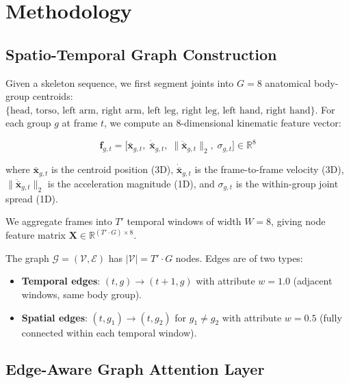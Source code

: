 \documentclass[conference]{IEEEtran}
\begin{document}
\section{Methodology}
\label{sec:method}

\subsection{Spatio-Temporal Graph Construction}

Given a skeleton sequence, we first segment joints into $G=8$ anatomical body-group 
centroids: $\{\text{head, torso, left arm, right arm, left leg, right leg, 
left hand, right hand}\}$.
For each group $g$ at frame $t$, we compute an 8-dimensional kinematic feature vector:

\begin{equation}
  \mathbf{f}_{g,t} = \bigl[\bar{\mathbf{x}}_{g,t},\; \dot{\bar{\mathbf{x}}}_{g,t},\;
  \|\ddot{\bar{\mathbf{x}}}_{g,t}\|_2,\; \sigma_{g,t}\bigr]
  \in \mathbb{R}^{8}
  \label{eq:node_feat}
\end{equation}

where $\bar{\mathbf{x}}_{g,t}$ is the centroid position (3D), 
$\dot{\bar{\mathbf{x}}}_{g,t}$ is the frame-to-frame velocity (3D), 
$\|\ddot{\bar{\mathbf{x}}}_{g,t}\|_2$ is the acceleration magnitude (1D), 
and $\sigma_{g,t}$ is the within-group joint spread (1D).

We aggregate frames into $T'$ temporal windows of width $W=8$, 
giving node feature matrix $\mathbf{X} \in \mathbb{R}^{(T' \cdot G) \times 8}$.

The graph $\mathcal{G} = (\mathcal{V}, \mathcal{E})$ has $|\mathcal{V}| = T' \cdot G$ 
nodes. Edges are of two types:
\begin{itemize}
  \item \textbf{Temporal edges}: $(t,g) \rightarrow (t{+}1,g)$ with 
        attribute $w = 1.0$ (adjacent windows, same body group).
  \item \textbf{Spatial edges}: $(t,g_1) \rightarrow (t,g_2)$ for $g_1 \ne g_2$ 
        with attribute $w = 0.5$ (fully connected within each temporal window).
\end{itemize}

\subsection{Edge-Aware Graph Attention Layer}
\label{sec:edgeattn}
\end{document}
